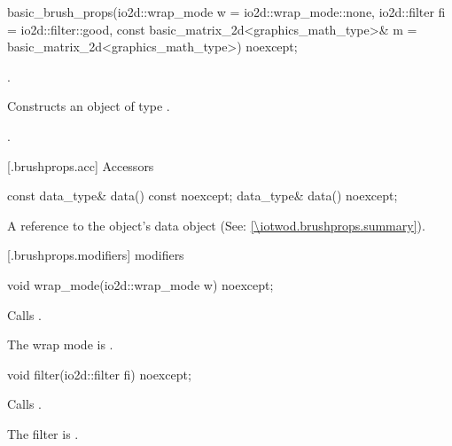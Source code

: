 %
\begin{itemdecl}
basic_brush_props(io2d::wrap_mode w = io2d::wrap_mode::none,
  io2d::filter fi = io2d::filter::good,
  const basic_matrix_2d<graphics_math_type>& m = basic_matrix_2d<graphics_math_type>{})
  noexcept;
\end{itemdecl}
\begin{itemdescr}
\pnum
\requires
{}.

\pnum
\effects
Constructs an object of type .

\pnum
\postconditions
{}.
\end{itemdescr}

 [\iotwod.brushprops.acc] {Accessors}

%
\begin{itemdecl}
const data_type& data() const noexcept;
data_type& data() noexcept;
\end{itemdecl}
\begin{itemdescr}
\pnum
\returns A reference to the  object's data object (See: \ref{\iotwod.brushprops.summary}).
\end{itemdescr}

 [\iotwod.brushprops.modifiers] { modifiers}

%
\begin{itemdecl}
void wrap_mode(io2d::wrap_mode w) noexcept;
\end{itemdecl}
\begin{itemdescr}
\pnum
\effects
Calls .

\pnum
\remarks
The wrap mode is .
\end{itemdescr}

%
\begin{itemdecl}
void filter(io2d::filter fi) noexcept;
\end{itemdecl}
\begin{itemdescr}
\pnum
\effects
Calls .

\pnum
\remarks
The filter is .
\end{itemdescr}

